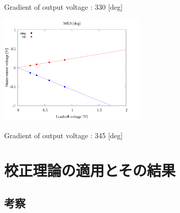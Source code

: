 \begin{multicols}{2}
\begin{figure_here}
\begin{center}
            \caption{Gradient of output voltage : 330 [deg]}
            \includegraphics[width=70mm]{../../02_workspace/result/2-1/plot/04/04_linear_3450.png}
            \caption{Gradient of output voltage : 345 [deg]}
        \end{center}
    \end{figure_here}
\end{multicols}

\section{校正理論の適用とその結果}




\subsection{考察}